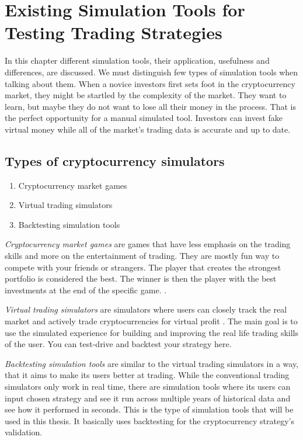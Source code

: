 \chapter{Existing Simulation Tools for Testing Trading Strategies}
\label{simulation-tools}

In this chapter different simulation tools, their application, usefulness and differences, are discussed. We must distinguish few types of simulation tools when talking about them. When a novice investors first sets foot in the cryptocurrency market, they might be startled by the complexity of the market. They want to learn, but maybe they do not want to lose all their money in the process. That is the perfect opportunity for a manual simulated tool. Investors can invest fake virtual money while all of the market's trading data is accurate and up to date.

\section*{Types of cryptocurrency simulators}

\begin{enumerate}
    \item Cryptocurrency market games
    \item Virtual trading simulators
    \item Backtesting simulation tools
\end{enumerate}

\emph{Cryptocurrency market games} are games that have less emphasis on the trading skills and more on the entertainment of trading. They are mostly fun way to compete with your friends or strangers. The player that creates the strongest portfolio is considered the best. The winner is then the player with the best investments at the end of the specific game. \cite{top-stocks-crypto-trading-simulators}.

\emph{Virtual trading simulators} are simulators where users can closely track the real market and actively trade cryptocurrencies for virtual profit \cite{top-stocks-crypto-trading-simulators}. The main goal is to use the simulated experience for building and improving the real life trading skills of the user. You can test-drive and backtest your strategy here.

\emph{Backtesting simulation tools} are similar to the virtual trading simulators in a way, that it aims to make its users better at trading. While the conventional trading simulators only work in real time, there are simulation tools where its users can input chosen strategy and see it run across multiple years of historical data and see how it performed in seconds. This is the type of simulation tools that will be used in this thesis. It basically uses backtesting for the cryptocurrency strategy's validation.


